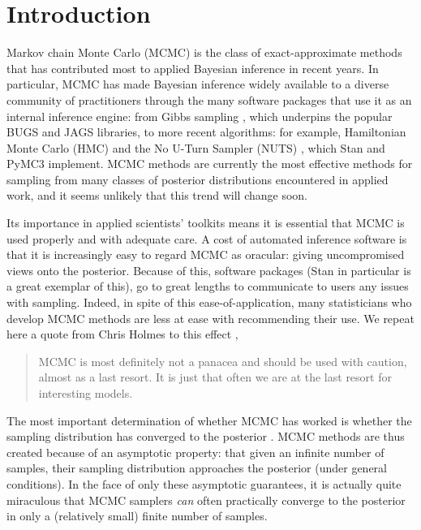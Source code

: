\documentclass{article}
\begin{document}
\section{Introduction}
Markov chain Monte Carlo (MCMC) is the class of exact-approximate methods that has contributed most to applied Bayesian inference in recent years. In particular, MCMC has made Bayesian inference widely available to a diverse community of practitioners through the many software packages that use it as an internal inference engine: from Gibbs sampling \cite{geman1984stochastic}, which underpins the popular BUGS \cite{lunn2000winbugs} and JAGS \cite{plummer2003jags} libraries, to more recent algorithms: for example, Hamiltonian Monte Carlo (HMC) \cite{neal2011mcmc} and the No U-Turn Sampler (NUTS) \cite{hoffman2014no}, which Stan \cite{carpenter2017stan} and PyMC3 \cite{salvatier2016probabilistic} implement. MCMC methods are currently the most effective methods for sampling from many classes of posterior distributions encountered in applied work, and it seems unlikely that this trend will change soon.

Its importance in applied scientists' toolkits means it is essential that MCMC is used properly and with adequate care. A cost of automated inference software is that it is increasingly easy to regard MCMC as oracular: giving uncompromised views onto the posterior. Because of this, software packages (Stan in particular \cite{carpenter2017stan} is a great exemplar of this), go to great lengths to communicate to users any issues with sampling. Indeed, in spite of this ease-of-application, many statisticians who develop MCMC methods are less at ease with recommending their use. We repeat here a quote from Chris Holmes to this effect \cite{holmes},

\begin{quote}
	MCMC is most definitely not a panacea and should be used with caution, almost as a last resort. It is just that often we are at the last resort for interesting models.
\end{quote}

The most important determination of whether MCMC has worked is whether the sampling distribution has converged to the posterior \cite{lambert2018Student}. MCMC methods are thus created because of an asymptotic property: that given an infinite number of samples, their sampling distribution approaches the posterior (under general conditions). In the face of only these asymptotic guarantees, it is actually quite miraculous that MCMC samplers \textit{can} often practically converge to the posterior in only a (relatively small) finite number of samples.
\end{document}
